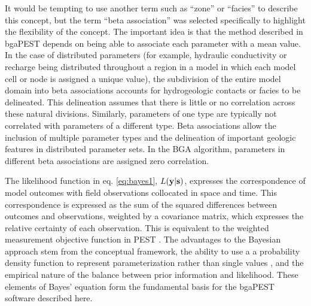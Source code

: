 \documentclass[11pt,oneside,onecolumn]{usgsreport}
\begin{document}
\begin{multicols}{2}
It would be tempting to use another term such as ``zone'' or ``facies''
to describe this concept, but the term ``beta association'' was selected
specifically to highlight the flexibility of the concept. The important
idea is that the method described in bgaPEST depends on being able
to associate each parameter with a mean value. In the case of distributed
parameters (for example, hydraulic conductivity or recharge being
distributed throughout a region in a model in which each model cell
or node is assigned a unique value), the subdivision of the entire
model domain into beta associations accounts for hydrogeologic contacts
or facies to be delineated. This delineation assumes that there is
little or no correlation across these natural divisions. Similarly,
parameters of one type are typically not correlated with parameters
of a different type. Beta associations allow the inclusion of multiple
parameter types and the delineation of important geologic features
in distributed parameter sets. In the BGA algorithm, parameters in
different beta associations are assigned zero correlation.

The likelihood function in eq. \ref{eq:bayes1}, $L\text{\ensuremath{\left(\mathbf{y}|\mathbf{s}\right)}}$,
expresses the correspondence of model outcomes with field observations
collocated in space and time. This correspondence is expressed as
the sum of the squared differences between outcomes and observations,
weighted by a covariance matrix, which expresses the relative certainty
of each observation. This is equivalent to the weighted measurement
objective function in PEST \citep{PEST}. The advantages to the Bayesian
approach stem from the conceptual framework, the ability to use a
a probability density function to represent parameterization rather
than single values , and the empirical nature of the balance between
prior information and likelihood. These elements of Bayes' equation
form the fundamental basis for the bgaPEST software described here.


\end{multicols}
\end{document}
